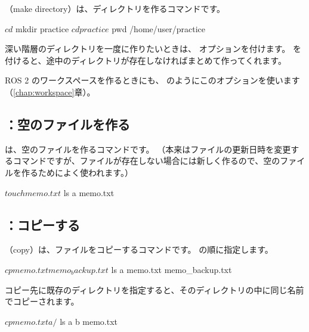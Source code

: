 （make directory）は、ディレクトリを作るコマンドです。

\begin{terminal}[ディレクトリを作る]
$ cd
$ mkdir practice
$ cd practice
$ pwd
/home/user/practice
\end{terminal}

深い階層のディレクトリを一度に作りたいときは、 オプションを付けます。
 を付けると、途中のディレクトリが存在しなければまとめて作ってくれます。


ROS 2 のワークスペースを作るときにも、 のようにこのオプションを使います（\ref{chap:workspace}章）。

\subsection{：空のファイルを作る}

 は、空のファイルを作るコマンドです。
（本来はファイルの更新日時を変更するコマンドですが、ファイルが存在しない場合には新しく作るので、空のファイルを作るためによく使われます。）

\begin{terminal}[空のファイルを作る]
$ touch memo.txt
$ ls
a  memo.txt
\end{terminal}

\subsection{：コピーする}

（copy）は、ファイルをコピーするコマンドです。
 の順に指定します。

\begin{terminal}[ファイルをコピーする]
$ cp memo.txt memo_backup.txt
$ ls
a  memo.txt  memo_backup.txt
\end{terminal}

コピー先に既存のディレクトリを指定すると、そのディレクトリの中に同じ名前でコピーされます。

\begin{terminal}[ディレクトリの中にコピーする]
$ cp memo.txt a/
$ ls a
b  memo.txt
\end{terminal}

